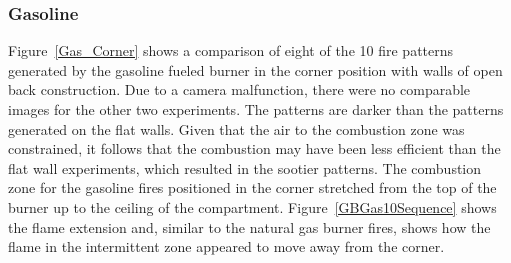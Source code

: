 \documentclass[twoside]{uocthesis}
\begin{document}
{\subsubsection{Gasoline}

Figure~\ref{Gas_Corner} shows a comparison of eight of the 10 fire patterns generated by the gasoline fueled burner in the corner position with walls of open back construction. Due to a camera malfunction, there were no comparable images for the other two experiments.  The patterns are darker than the patterns generated on the flat walls.  Given that the air to the combustion zone was constrained, it follows that the combustion may have been less efficient than the flat wall experiments, which resulted in the sootier patterns.  The combustion zone for the gasoline fires positioned in the corner stretched from the top of the burner up to the ceiling of the compartment.  Figure~\ref{GBGas10Sequence} shows the flame extension and, similar to the natural gas burner fires, shows how the flame in the intermittent zone appeared to move away from the corner.    

}
\end{document}
